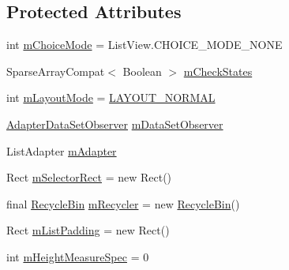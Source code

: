 \subsection*{Protected Attributes}
\begin{DoxyCompactItemize}
\item 
int \hyperlink{classit_1_1sephiroth_1_1android_1_1library_1_1widget_1_1_abs_h_list_view_a4311bb79e102db407e9fff36438542ed}{m\+Choice\+Mode} = List\+View.\+C\+H\+O\+I\+C\+E\+\_\+\+M\+O\+D\+E\+\_\+\+N\+O\+NE
\item 
Sparse\+Array\+Compat$<$ Boolean $>$ \hyperlink{classit_1_1sephiroth_1_1android_1_1library_1_1widget_1_1_abs_h_list_view_a3f7f97ad3cdde6cc3a01be449e80a278}{m\+Check\+States}
\item 
int \hyperlink{classit_1_1sephiroth_1_1android_1_1library_1_1widget_1_1_abs_h_list_view_aac088a9573c1dc4dc75fed058cf587bf}{m\+Layout\+Mode} = \hyperlink{classit_1_1sephiroth_1_1android_1_1library_1_1widget_1_1_abs_h_list_view_ab4e383b1104afa61becc46878c23a255}{L\+A\+Y\+O\+U\+T\+\_\+\+N\+O\+R\+M\+AL}
\item 
\hyperlink{classit_1_1sephiroth_1_1android_1_1library_1_1widget_1_1_abs_h_list_view_1_1_adapter_data_set_observer}{Adapter\+Data\+Set\+Observer} \hyperlink{classit_1_1sephiroth_1_1android_1_1library_1_1widget_1_1_abs_h_list_view_a9e68dfb2245bc416a3efdf70a3f34257}{m\+Data\+Set\+Observer}
\item 
List\+Adapter \hyperlink{classit_1_1sephiroth_1_1android_1_1library_1_1widget_1_1_abs_h_list_view_a8bd6cfb79e24175a9f4e89369ce4e0c1}{m\+Adapter}
\item 
Rect \hyperlink{classit_1_1sephiroth_1_1android_1_1library_1_1widget_1_1_abs_h_list_view_a96e60e6ddeb6b2e589678a0bbf5bb27d}{m\+Selector\+Rect} = new Rect()
\item 
final \hyperlink{classit_1_1sephiroth_1_1android_1_1library_1_1widget_1_1_abs_h_list_view_1_1_recycle_bin}{Recycle\+Bin} \hyperlink{classit_1_1sephiroth_1_1android_1_1library_1_1widget_1_1_abs_h_list_view_af99799d824db356bb2572c16e8d1ab83}{m\+Recycler} = new \hyperlink{classit_1_1sephiroth_1_1android_1_1library_1_1widget_1_1_abs_h_list_view_1_1_recycle_bin}{Recycle\+Bin}()
\item 
Rect \hyperlink{classit_1_1sephiroth_1_1android_1_1library_1_1widget_1_1_abs_h_list_view_a084eb87fbb8115eb946a74d12d8151bb}{m\+List\+Padding} = new Rect()
\item 
int \hyperlink{classit_1_1sephiroth_1_1android_1_1library_1_1widget_1_1_abs_h_list_view_a6ef6acc8cc22293f578a2737797dcc4e}{m\+Height\+Measure\+Spec} = 0

\end{DoxyCompactItemize}
